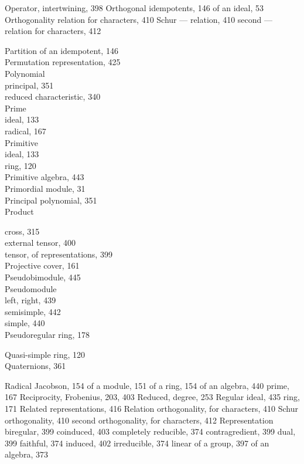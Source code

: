 
Operator, intertwining, 398 Orthogonal idempotents, 146 of an ideal, 53 Orthogonality relation for characters, 410 Schur --- relation, 410 second --- relation for characters, 412


Partition of an idempotent, 146\\
Permutation representation, 425\\
Polynomial\\
principal, 351\\
reduced characteristic, 340\\
Prime\\
ideal, 133\\
radical, 167\\
Primitive\\
ideal, 133\\
ring, 120\\
Primitive algebra, 443\\
Primordial module, 31\\
Principal polynomial, 351\\
Product

cross, 315\\
external tensor, 400\\
tensor, of representations, 399\\
Projective cover, 161\\
Pseudobimodule, 445\\
Pseudomodule\\
left, right, 439\\
semisimple, 442\\
simple, 440\\
Pseudoregular ring, 178


Quasi-simple ring, 120\\
Quaternions, 361


Radical Jacobson, 154 of a module, 151 of a ring, 154 of an algebra, 440 prime, 167 Reciprocity, Frobenius, 203, 403 Reduced, degree, 253 Regular ideal, 435 ring, 171 Related representations, 416 Relation orthogonality, for characters, 410 Schur orthogonality, 410 second orthogonality, for characters, 412 Representation biregular, 399 coinduced, 403 completely reducible, 374 contragredient, 399 dual, 399 faithful, 374 induced, 402 irreducible, 374 linear of a group, 397 of an algebra, 373

